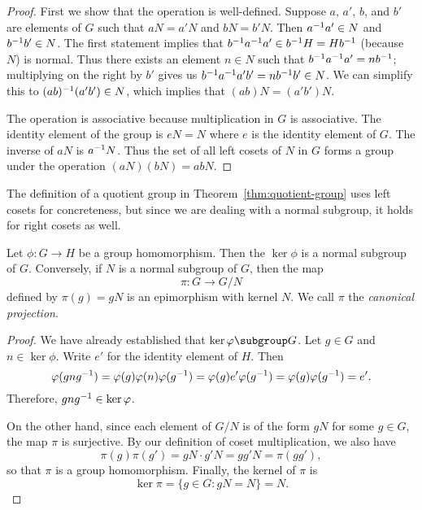 \begin{proof}
    First we show that the operation is well-defined. Suppose \(a\), \(a'\),
    \(b\), and \(b'\) are elements of \(G\) such that \(aN = a'N\) and \(bN =
    b'N\). Then \(a^{-1} a' \in N\) and \(b^{-1} b' \in N\). The first statement
    implies that \(b^{-1} a^{-1} a' \in b^{-1} H = Hb^{-1}\) (because \(N\)) is
    normal. Thus there exists an element \(n \in N\) such that \(b^{-1} a^{-1} a'
    = nb^{-1}\); multiplying on the right by \(b'\) gives us \(b^{-1} a^{-1} a'b' =
    nb^{-1} b' \in N\). We can simplify this to \((ab)^{-1}(a'b') \in N\), which
    implies that \((ab)N = (a'b')N\).

    The operation is associative because multiplication in \(G\) is associative.
    The identity element of the group is \(eN = N\) where \(e\) is the identity
    element of \(G\). The inverse of \(aN\) is \(a^{-1} N\). Thus the set of all
    left cosets of \(N\) in \(G\) forms a group under the operation \((aN)(bN) =
    abN\).
\end{proof}

\begin{remark}
    The definition of a quotient group in Theorem~\ref{thm:quotient-group} uses
    left cosets for concreteness, but since we are dealing with a normal
    subgroup, it holds for right cosets as well.
\end{remark}

\begin{theorem}
    Let \(\phi : G \to H\) be a group homomorphism. Then the \(\ker \phi\) is a
    normal subgroup of \(G\). Conversely, if \(N\) is a normal subgroup of
    \(G\), then the map
    \[
        \pi : G \to G/N
    \]
    defined by \(\pi(g) = gN\) is an epimorphism with kernel \(N\). We call
    \(\pi\) the \emph{canonical projection}.
\end{theorem}

\begin{proof}
    We have already established that \(\ker \phi \subgroup G\). Let \(g \in G\)
    and \(n \in \ker \phi\). Write \(e'\) for the identity element of \(H\).
    Then
    \[
        \varphi(gng^{-1}) = \varphi(g)\varphi(n)\varphi(g^{-1}) = \varphi(g)e'\varphi(g^{-1}) = \varphi(g)\varphi(g^{-1}) = e'.
    \]
    Therefore, \(gng^{-1} \in \ker \varphi\).

    On the other hand, since each element of \(G/N\) is of the form \(gN\) for
    some \(g \in G\), the map \(\pi\) is surjective. By our definition of coset
    multiplication, we also have
    \[
        \pi(g)\pi(g') = gN \cdot g'N = gg'N = \pi(gg'),
    \]
    so that \(\pi\) is a group homomorphism. Finally, the kernel of \(\pi\) is
    \[
        \ker \pi = \{g \in G : gN = N\} = N.
    \]
\end{proof}

